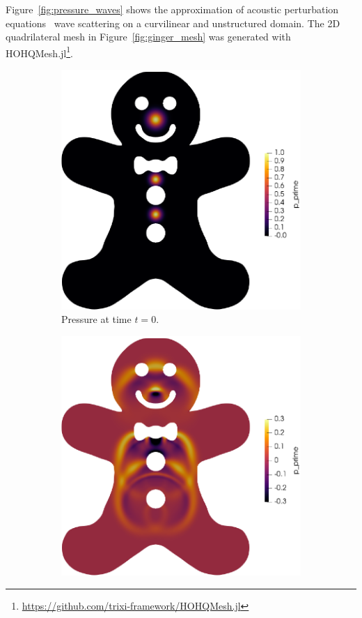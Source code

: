 \documentclass{juliacon}
\begin{document}
Figure~\ref{fig:pressure_waves} shows the approximation
of acoustic perturbation equations~\cite{ewert2003acoustic} wave scattering on a
curvilinear and unstructured domain. The 2D quadrilateral mesh in
Figure~\ref{fig:ginger_mesh} was generated with
HOHQMesh.jl\xspace\footnote{\url{https://github.com/trixi-framework/HOHQMesh.jl}}.
\begin{figure}[!h]
  \begin{subfigure}{0.475\linewidth}
    \includegraphics[width=\textwidth]{../figures/ginger_time_00}
    \caption{Pressure at time $t = 0$.}
  \end{subfigure}%
  \hspace*{\fill}
  \begin{subfigure}{0.475\linewidth}
    \includegraphics[width=\textwidth]{../figures/ginger_time_08}

\end{subfigure}
\end{figure}
\end{document}
